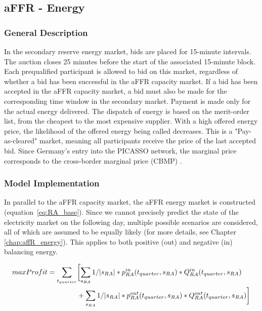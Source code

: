 \subsection{aFFR - Energy}
\label{subsec:RA}
\subsubsection{General Description}
In the secondary reserve energy market, bids are placed for 15-minute intervals.
The auction closes 25 minutes before the start of the associated 15-minute block. Each prequalified
participant is allowed to bid on this market, regardless of whether a bid has been successful
in the aFFR capacity market. If a bid has been accepted in the aFFR capacity market,
a bid must also be made for the corresponding time window in the secondary market.
Payment is made only for the actual energy delivered. The dispatch of energy is based on the merit-order list,
from the cheapest to the most expensive supplier. With a high offered energy price, the likelihood of the offered
energy being called decreases. This is a "Pay-as-cleared" market, meaning all participants receive the price of the
last accepted bid. Since Germany's entry into the PICASSO network, the marginal price corresponds to the cross-border marginal price
(CBMP) \cite{50hertzamprionTENNETTRANSNETBW.}.


\subsubsection{Model Implementation}
In parallel to the aFFR capacity market, the aFFR energy market is constructed (equation~\ref{eq:RA_base}).
Since we cannot precisely predict the state of the electricity market on the following day,
multiple possible scenarios are considered, all of which are assumed to be equally likely
(for more details, see Chapter \ref{chap:affR_energy}). This applies to both positive (out) and negative (in) balancing energy.

\begin{alignat}{3}
	max Profit =  \sum_{t_{quarter}} & \biggl[ \sum_{s_{RA}}1/|s_{RA}| * p^{in}_{RA}(t_{quarter}, s_{RA}) * Q^{in}_{RA}(t_{quarter}, s_{RA})				\notag              \\
	                                 & + \sum_{s_{RA}}1/|s_{RA}| * p^{out}_{RA}(t_{quarter}, s_{RA}) * Q^{out}_{RA}(t_{quarter}, s_{RA}) \biggr] \label{eq:RA_base}
\end{alignat}

